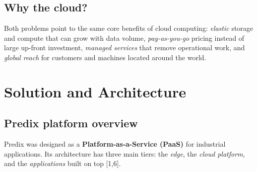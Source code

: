 \documentclass[12pt,a4paper]{article}
\begin{document}
\subsection{Why the cloud?}
Both problems point to the same core benefits of cloud computing: \emph{elastic} storage and compute that can grow with
data volume, \emph{pay-as-you-go} pricing instead of large up-front investment, \emph{managed services} that remove
operational work, and \emph{global reach} for customers and machines located around the world.

\section{Solution and Architecture}
\subsection{Predix platform overview}
Predix was designed as a \textbf{Platform-as-a-Service (PaaS)} for industrial applications. Its architecture has three
main tiers: the \emph{edge}, the \emph{cloud platform}, and the \emph{applications} built on top [1,6].
\end{document}
